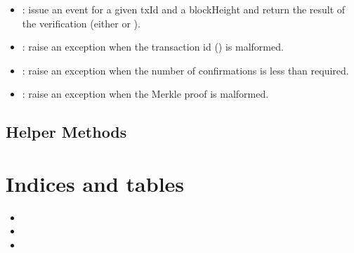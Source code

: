 \documentclass[letterpaper,10pt,english]{sphinxmanual}
\begin{document}
\begin{itemize}
\item {} 
: issue an event for a given txId and a blockHeight and return the result of the verification (either  or ).

\end{itemize}

\begin{itemize}
\item {} 
: raise an exception when the transaction id () is malformed.

\item {} 
: raise an exception when the number of confirmations is less than required.

\item {} 
: raise an exception when the Merkle proof is malformed.

\end{itemize}


\section{Helper Methods}
\label{\detokenize{functions:helper-methods}}

\chapter{Indices and tables}
\label{\detokenize{index:indices-and-tables}}\begin{itemize}
\item {} 

\item {} 

\item {} 

\end{itemize}



\renewcommand{\indexname}{Index}
\printindex
\end{document}
